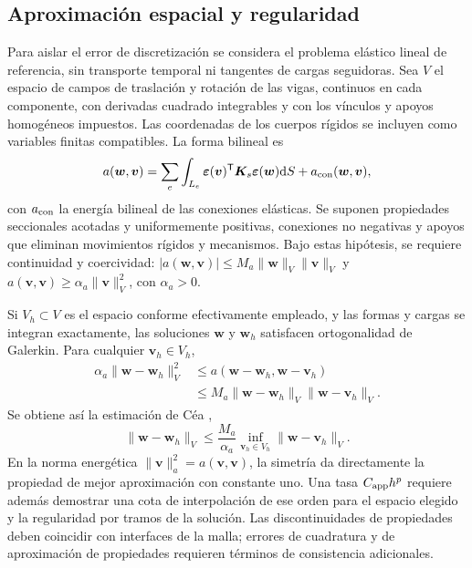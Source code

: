\subsection{Aproximación espacial y regularidad}
Para aislar el error de discretización se considera el problema elástico lineal de referencia, sin transporte temporal ni tangentes de cargas seguidoras. Sea $V$ el espacio de campos de traslación y rotación de las vigas, continuos en cada componente, con derivadas cuadrado integrables y con los vínculos y apoyos homogéneos impuestos. Las coordenadas de los cuerpos rígidos se incluyen como variables finitas compatibles. La forma bilineal es
\begin{equation}
a(\bm w,\bm v)=\sum_e\int_{L_e}
\bm\varepsilon(\bm v)^\mathsf T\bm K_s\bm\varepsilon(\bm w)\mathrm d S
+a_{\rm con}(\bm w,\bm v),
\label{eq:ap-bilinear}
\end{equation}
con $a_{\rm con}$ la energía bilineal de las conexiones elásticas. Se suponen propiedades seccionales acotadas y uniformemente positivas, conexiones no negativas y apoyos que eliminan movimientos rígidos y mecanismos. Bajo estas hipótesis, se requiere continuidad y coercividad: $|a(\bm w,\bm v)|\le M_a\|\bm w\|_V\|\bm v\|_V$ y $a(\bm v,\bm v)\ge\alpha_a\|\bm v\|_V^2$, con $\alpha_a>0$.

Si $V_h\subset V$ es el espacio conforme efectivamente empleado, y las formas y cargas se integran exactamente, las soluciones $\bm w$ y $\bm w_h$ satisfacen ortogonalidad de Galerkin. Para cualquier $\bm v_h\in V_h$,
\begin{align}
\alpha_a\|\bm w-\bm w_h\|_V^2
&\le a(\bm w-\bm w_h,\bm w-\bm v_h)\nonumber\\
&\le M_a\|\bm w-\bm w_h\|_V\|\bm w-\bm v_h\|_V.
\end{align}
Se obtiene así la estimación de Céa \citep{cea1964},
\begin{equation}
\|\bm w-\bm w_h\|_V\le\frac{M_a}{\alpha_a}
\inf_{\bm v_h\in V_h}\|\bm w-\bm v_h\|_V.
\label{eq:ap-cea}
\end{equation}
En la norma energética $\|\bm v\|_a^2=a(\bm v,\bm v)$, la simetría da directamente la propiedad de mejor aproximación con constante uno. Una tasa $C_{\rm app}h^p$ requiere además demostrar una cota de interpolación de ese orden para el espacio elegido y la regularidad por tramos de la solución. Las discontinuidades de propiedades deben coincidir con interfaces de la malla; errores de cuadratura y de aproximación de propiedades requieren términos de consistencia adicionales.

